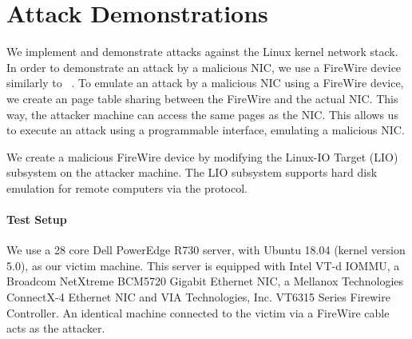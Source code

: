 \section{Attack Demonstrations}\label{Sec:setup}


We implement and demonstrate \compound attacks against the Linux kernel network stack. 
In order to demonstrate an attack by a malicious NIC, we use a FireWire device similarly to \DIFaddbegin {}\DIFaddend ~\cite{SLND10}. To emulate an attack by a malicious NIC using a FireWire device, we create an \iova{} page table sharing between the FireWire and the actual NIC. \DIFdelbegin {}\DIFdelend This way, the attacker machine can access the same pages as the NIC. This allows us to execute an attack using a programmable interface, emulating a malicious NIC.
\DIFdelbegin {}\DIFdelend 


We create a malicious FireWire device by modifying the Linux-IO Target (LIO) subsystem on the attacker machine. The LIO subsystem supports hard disk emulation for remote computers via the \spb{} protocol. 
\DIFdelbegin {}%
\DIFdelend 

\paragraph{Test Setup}
We use a 28 core Dell PowerEdge R730 server, with Ubuntu 18.04 (kernel version 5.0), as our victim machine. This server is equipped with \DIFaddbegin {}\DIFaddend Intel VT-d IOMMU, a Broadcom NetXtreme BCM5720 Gigabit Ethernet NIC, a Mellanox Technologies ConnectX-4 Ethernet NIC and VIA Technologies, Inc. VT6315 Series Firewire Controller. An identical machine connected to the victim via a FireWire cable acts as the attacker. 
\DIFaddbegin 

